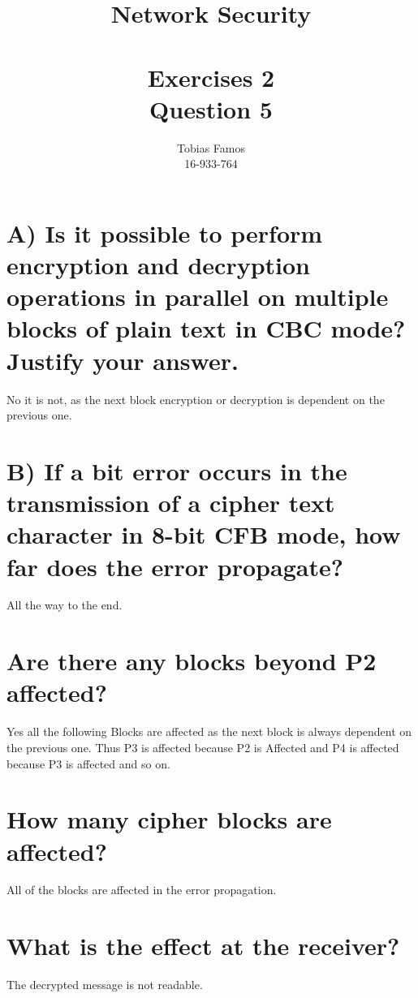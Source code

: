 \documentclass[11pt,a4paper]{article}
\title{Network Security \\ ~\\ \Large{Exercises 2 \\Question 5}}
\author{Tobias Famos\\ 16-933-764}
\begin{document}
    \maketitle
    \section*{A) Is it possible to perform encryption and decryption operations in parallel on
    multiple blocks of plain text in CBC mode? Justify your answer.}
    No it is not, as the next block encryption or decryption is dependent on the previous one.
    \section*{B) If a bit error occurs in the transmission of a cipher text character in 8-bit
    CFB mode, how far does the error propagate?}
    All the way to the end.
    \section*{Are there any blocks beyond P2 affected?}
    Yes all the following Blocks are affected as the next block is always dependent on the previous one.
    Thus P3 is affected because P2 is Affected and P4 is affected because P3 is affected and so on.
    \section*{How many cipher blocks are affected?}
    All of the blocks are affected in the error propagation.
    \section*{What is the effect at the receiver?}
    The decrypted message is not readable.
\end{document}
